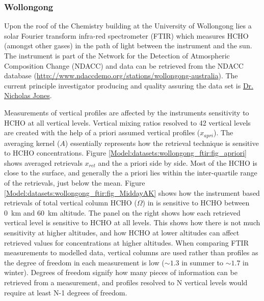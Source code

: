     \subsubsection{Wollongong}
    \label{Model:datasets:wollongong_ftir}
    
      Upon the roof of the Chemistry building at the University of Wollongong lies a solar Fourier transform infra-red spectrometer (FTIR) which measures HCHO (amongst other gases) in the path of light between the instrument and the sun.
      The instrument is part of the Network for the Detection of Atmospheric Composition Change (NDACC) and data can be retrieved from the NDACC database (\url{http://www.ndaccdemo.org/stations/wollongong-australia}).
      The current principle investigator producing and quality assuring the data set is \href{mailto:njones@uow.edu.au}{Dr. Nicholas Jones}.
      
      Measurements of vertical profiles are affected by the instruments sensitivity to HCHO at all vertical levels.
      Vertical mixing ratios resolved to 42 vertical levels are created with the help of a priori assumed vertical profiles ($x_{apri}$).
      The averaging kernel ($A$) essentially represents how the retrieval technique is sensitive to HCHO concentrations.
      Figure \ref{Model:datasets:wollongong_ftir:fig_apriori} shows averaged retrievals $x_{ret}$ and the a priori side by side.
      Most of the HCHO is close to the surface, and generally the a priori lies within the inter-quartile range of the retrievals, just below the mean.
      Figure \ref{Model:datasets:wollongong_ftir:fig_MiddayAK} shows how the instrument based retrievals of total vertical column HCHO ($\Omega$) in \moleccm is sensitive to HCHO between 0~km and 60~km altitude.
      The panel on the right shows how each retrieved vertical level is sensitive to HCHO at all levels.
      This shows how there is not much sensitivity at higher altitudes, and how HCHO at lower altitudes can affect retrieved values for concentrations at higher altitudes.
      When comparing FTIR measurements to modelled data, vertical columns are used rather than profiles as the degree of freedom in each measurement is low ($\sim 1.3$ in summer to $\sim 1.7$ in winter).
      Degrees of freedom signify how many pieces of information can be retrieved from a measurement, and profiles resolved to N vertical levels would require at least N-1 degrees of freedom.
      
      

